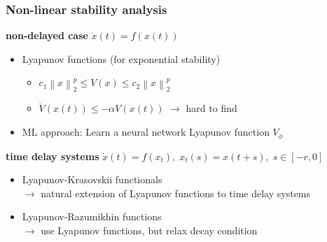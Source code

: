 \documentclass[11pt,aspectratio=169]{beamer}
\newcommand{\norm}[1]{\left\lVert#1\right\rVert}
\begin{document}

\begin{frame}[t]
    \frametitle{Non-linear stability analysis} 
    \textbf{non-delayed case} \; $\dot{x}(t) = f(x(t))$
        \begin{itemize}
            \item Lyapunov functions (for exponential stability)
                \begin{itemize}
                    \item $c_1\norm{x}_2^p \leq V(x) \leq c_2\norm{x}_2^p$
                    \item $\dot{V}\left(x(t)\right)\leq -\alpha V(x(t))$ \hspace{1.5cm} $\to$ hard to find
                \end{itemize}
            \item ML approach: Learn a neural network Lyapunov function $V_\phi$
        \end{itemize}
        \vspace{0.5cm}
    \textbf{time delay systems} \; $\dot{x}(t) = f(x_t),\; x_t(s)=x(t+s),\; s\in[-r,0]$
        \begin{itemize}
            \item Lyapunov-Krasovskii functionals\\
            $\to$ natural extension of Lyapunov functions to time delay systems
            \item Lyapunov-Razumikhin functions\\
            $\to$ use Lyapunov functions, but relax decay condition
            
        \end{itemize}
\end{frame}

\end{document}
